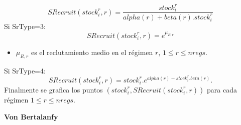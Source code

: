 \documentclass{article}
\begin{document}
\begin{equation}
SRecruit(stock^r_i,r)=\dfrac{stock^r_i}{alpha(r)+beta(r).stock^r_i}
        \end{equation}
Si SrType=3:
\begin{equation}
SRecruit(stock^r_i,r)=e^{\mu_{R,r}}
\end{equation}
\begin{itemize}
    \item $\mu_{R,r}$ es el reclutamiento medio en el régimen $r$, $1\leq r \leq nregs$.
\end{itemize}
Si SrType=4:
\begin{equation}
SRecruit(stock^r_i,r) =  stock^r_i.e^{alpha(r)-stock^r_i.beta(r)}.
\end{equation}
Finalmente se grafica los puntos $(stock^r_i, SRecruit(stock^r_i,r))$ para cada régimen $1\leq r \leq nregs$.














\textbf{Von Bertalanfy}
\end{document}
